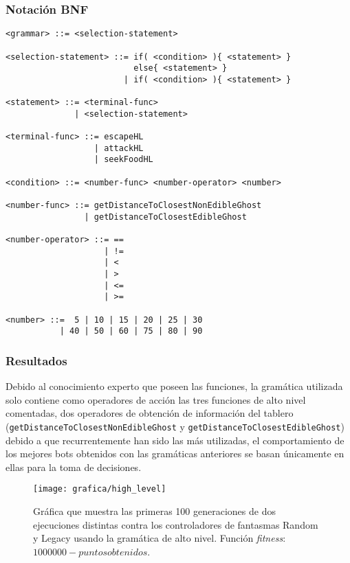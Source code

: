 \subsubsection{Notación BNF}
\begin{lstlisting}[caption={Gramática de alto nivel.}]
<grammar> ::= <selection-statement>

<selection-statement> ::= if( <condition> ){ <statement> }
                          else{ <statement> }
                        | if( <condition> ){ <statement> }

<statement> ::= <terminal-func>
              | <selection-statement>

<terminal-func> ::= escapeHL
                  | attackHL
                  | seekFoodHL

<condition> ::= <number-func> <number-operator> <number>

<number-func> ::= getDistanceToClosestNonEdibleGhost
                | getDistanceToClosestEdibleGhost

<number-operator> ::= ==
                    | !=
                    | <
                    | >
                    | <=
                    | >=

<number> ::=  5 | 10 | 15 | 20 | 25 | 30
           | 40 | 50 | 60 | 75 | 80 | 90
\end{lstlisting}

\subsubsection{Resultados}
Debido al conocimiento experto que poseen las funciones, la gramática utilizada solo contiene como operadores de acción las tres funciones de alto nivel comentadas, dos operadores de obtención de información del tablero  (\texttt{getDistanceToClosestNonEdibleGhost} y \texttt{getDistanceToClosestEdibleGhost}) debido a que recurrentemente han sido las más utilizadas, el comportamiento de los mejores bots obtenidos con las gramáticas anteriores se basan únicamente en ellas para la toma de decisiones.
\begin{figure}[H]
\centering
\texttt{[image: grafica/high\_level]}
\caption{Gráfica que muestra las primeras 100 generaciones de dos ejecuciones distintas contra los controladores de fantasmas Random y Legacy usando la gramática de alto nivel. Función \textit{fitness}: $1000000 - puntos obtenidos$.}
\end{figure}

